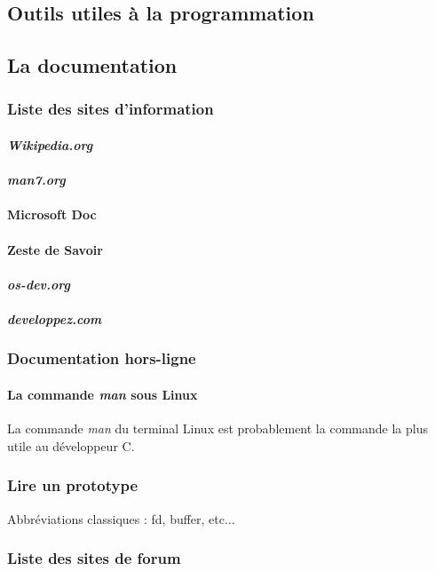 \documentclass{minitelreport}
\begin{document}
\begin{refsection}
	\chapter{Outils utiles à la programmation}
		\section{La documentation}
			\subsection{Liste des sites d'information}
				\subsubsection{\textit{Wikipedia.org}}	
				\subsubsection{\textit{man7.org}}
				\subsubsection{Microsoft Doc}
				\subsubsection{Zeste de Savoir}
				\subsubsection{\textit{os-dev.org}}
				\subsubsection{\textit{developpez.com}}
			\subsection{Documentation hors-ligne}
				\subsubsection{La commande \textit{man} sous Linux}
				La commande \textit{man} du terminal Linux est probablement la commande la plus utile au développeur C.
			\subsection{Lire un prototype}
			Abbréviations classiques : fd, buffer, etc...
			\subsection{Liste des sites de forum}

\end{refsection}
\end{document}
